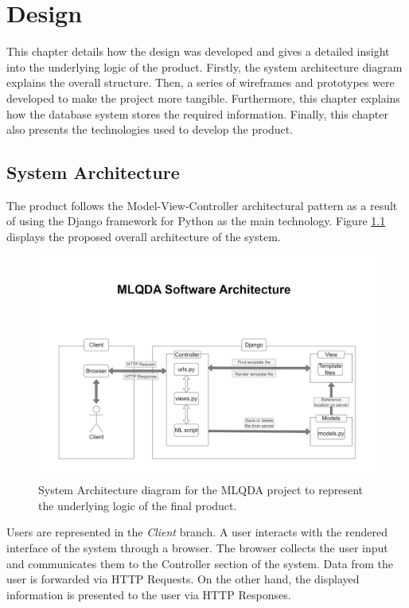 \documentclass{l4proj}
\begin{document}
\chapter{Design}
This chapter details how the design was developed and gives a detailed insight into the underlying logic of the product. Firstly, the system architecture diagram explains the overall structure. Then, a series of wireframes and prototypes were developed to make the project more tangible. Furthermore, this chapter explains how the database system stores the required information. Finally, this chapter also presents the technologies used to develop the product.

\section{System Architecture}
The product follows the Model-View-Controller architectural pattern as a result of using the Django framework for Python as the main technology. Figure \ref{fig:mlqda-SA-diagram} displays the proposed overall architecture of the system.

\begin{figure}[H]
    \centering
    \includegraphics[width=1\linewidth]{images/mlqda_software_architecture_updated.jpg}    
    \caption{System Architecture diagram for the MLQDA project to represent the underlying logic of the final product.}
    \label{fig:mlqda-SA-diagram} 
\end{figure}

Users are represented in the \textit{Client} branch. A user interacts with the rendered interface of the system through a browser. The browser collects the user input and communicates them to the Controller section of the system. Data from the user is forwarded via HTTP Requests. On the other hand, the displayed information is presented to the user via HTTP Responses.
\end{document}
